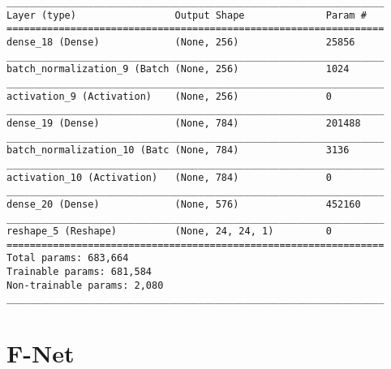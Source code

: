 \begin{verbatim}
_________________________________________________________________
Layer (type)                 Output Shape              Param #   
=================================================================
dense_18 (Dense)             (None, 256)               25856     
_________________________________________________________________
batch_normalization_9 (Batch (None, 256)               1024      
_________________________________________________________________
activation_9 (Activation)    (None, 256)               0         
_________________________________________________________________
dense_19 (Dense)             (None, 784)               201488    
_________________________________________________________________
batch_normalization_10 (Batc (None, 784)               3136      
_________________________________________________________________
activation_10 (Activation)   (None, 784)               0         
_________________________________________________________________
dense_20 (Dense)             (None, 576)               452160    
_________________________________________________________________
reshape_5 (Reshape)          (None, 24, 24, 1)         0         
=================================================================
Total params: 683,664
Trainable params: 681,584
Non-trainable params: 2,080
_________________________________________________________________
\end{verbatim}

\section{F-Net}
\label{appendix:fnet}


